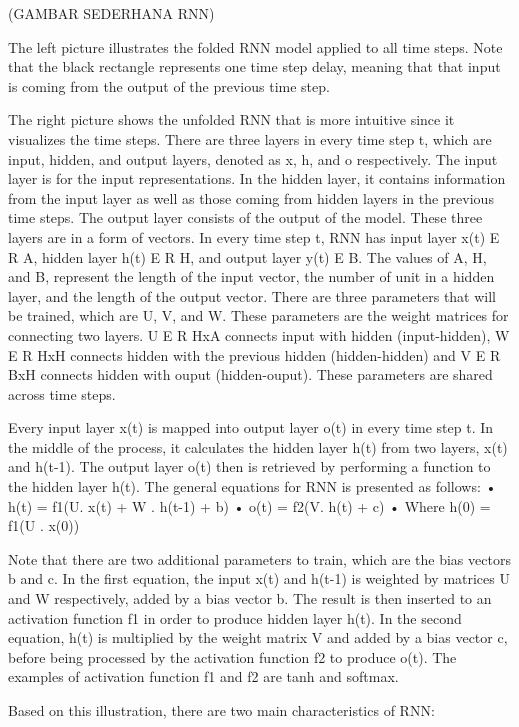 (GAMBAR SEDERHANA RNN)

The left picture illustrates the folded RNN model applied to all time steps. Note that the black rectangle represents one time step delay, meaning that that input is coming from the output of the previous time step. 

The right picture shows the unfolded RNN that is more intuitive since it visualizes the time steps. There are three layers in every time step t, which are input, hidden, and output layers, denoted as x, h, and o respectively. The input layer is for the input representations. In the hidden layer, it contains information from the input layer as well as those coming from hidden layers in the previous time steps. The output layer consists of the output of the model. These three layers are in a form of vectors. In every time step t, RNN has input layer x(t) E R A, hidden layer h(t) E R H, and output layer y(t) E B. The values of A, H, and B, represent the length of the input vector, the number of unit in a hidden layer, and the length of the output vector. There are three parameters that will be trained, which are U, V, and W. These parameters are the weight matrices for connecting two layers. U E R HxA connects input with hidden (input-hidden), W E R HxH  connects hidden with the previous hidden (hidden-hidden) and V E R BxH connects hidden with ouput (hidden-ouput). These parameters are shared across time steps. 

Every input layer x(t) is mapped into output layer o(t) in every time step t. In the middle of the process, it calculates the hidden layer h(t) from two layers, x(t) and h(t-1). The output layer o(t) then is retrieved by performing a function to the hidden layer h(t). The general equations for RNN is presented as follows:
•	h(t) = f1(U. x(t) + W . h(t-1) + b)
•	o(t) = f2(V. h(t) + c)
•	Where h(0) = f1(U . x(0))

Note that there are two additional parameters to train, which are the bias vectors b and c. In the first equation, the input x(t) and h(t-1) is weighted by matrices U and W respectively, added by a bias vector b. The result is then inserted to an activation function f1 in order to produce hidden layer h(t). In the second equation, h(t) is multiplied by the weight matrix V and added by a bias vector c, before being processed by the activation function f2 to produce o(t). The examples of activation function f1 and f2 are tanh and softmax.

Based on this illustration, there are two main characteristics of RNN:

